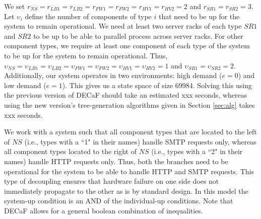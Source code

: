 \documentclass[12pt]{article}
\begin{document}
We set $r_{NS} = r_{LB1} = r_{LB2} = r_{FW1} = r_{FW2} = r_{HV1} = r_{HV2} =
2$ and $r_{SR1} = r_{SR2} = 3$. Let $\upsilon_i$ define the number of
components of type $i$ that need to be up for the system to remain
operational. We need at least two server racks of each type $SR1$ and $SR2$ to be
up to be able to parallel process across server racks. For other component
types, we require at least one component of each type of the system to be up
for the system to remain operational. Thus, $\upsilon_{NS} =
\upsilon_{LB1} = \upsilon_{LB2} = \upsilon_{FW1} = \upsilon_{FW2} =
\upsilon_{HV1} = \upsilon_{HV2} = 1$ and $\upsilon_{SR1} = \upsilon_{SR2} =
2$. Additionally, our system operates in two environments: high demand ($e =
0$) and low demand ($e = 1$). This gives us a state space of size 69984.
Solving this using the previous version of DECaF should take an estimated xxx
seconds, whereas using the new version's tree-generation algorithms given in
Section \ref{sec:alg} takes xxx seconds. 

We work with a system such that all component types that are located to the
left of $NS$ (i.e., types with a ``1" in their names) handle SMTP requests
only, whereas all component types located to the right of $NS$ (i.e., types
with a ``2" in their names) handle HTTP requests only. Thus, both the branches
need to be operational for the system to be able to handle HTTP and SMTP
requests. This type of decoupling ensures that hardware failure on one side
does not immediately propagate to the other as is by standard design. In this
model the system-up condition is an AND of the individual-up conditions. Note
that DECaF allows for a general boolean combination of inequalities.
\end{document}
